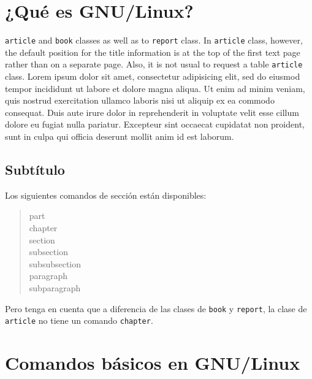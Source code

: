 \chapter{¿Qué es GNU/Linux?}

	\lipsum[1] \texttt{article} and \texttt{book} classes as well as to \texttt{report} class. In \texttt{article} class, however, the default position for the title information is at the top of the first text page rather than on a separate page. Also, it is not usual to request a table  \texttt{article} class.
	Lorem ipsum dolor sit amet, consectetur adipisicing elit, sed do eiusmod tempor incididunt ut labore et dolore magna aliqua. Ut enim ad minim veniam, quis nostrud exercitation ullamco laboris nisi ut aliquip ex ea commodo consequat. Duis aute irure dolor in reprehenderit in voluptate velit esse cillum dolore eu fugiat nulla pariatur. Excepteur sint occaecat cupidatat non proident, sunt in culpa qui officia deserunt mollit anim id est laborum.
\section{Subtítulo}

Los siguientes comandos de sección están disponibles:
\begin{quote}
 part \\
 chapter \\%
 section \\
 subsection \\
 subsubsection \\
 paragraph \\
 subparagraph
\end{quote}%

Pero tenga en cuenta que  a diferencia de las clases de \texttt{book} y \texttt{report}, la clase de \texttt{article} no tiene un comando \texttt{chapter}.

\chapter{Comandos básicos en GNU/Linux}
	\lipsum[1]
